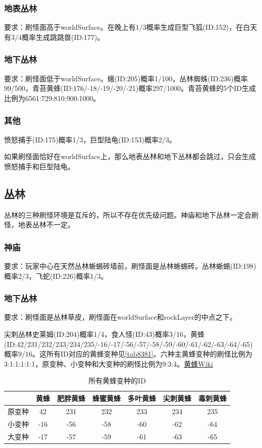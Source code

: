 \subsubsection{地表丛林}
要求：刷怪面高于worldSurface。在晚上有1/3概率生成巨型飞狐(ID:152)，在白天有3/4概率生成跳跳兽(ID:177)。

\subsubsection{地下丛林}
要求：刷怪面低于worldSurface。蛾(ID:205)概率1/100，丛林蜘蛛(ID:236)概率99/500，青苔黄蜂(ID:176/-18/-19/-20/-21)概率297/1000。青苔黄蜂的5个ID生成比例为6561:729:810:900:1000。

\subsubsection{其他}
愤怒捕手(ID:175)概率1/3，巨型陆龟(ID:153)概率2/3。

\begin{remark}
如果刷怪面恰好在worldSurface上，那么地表丛林和地下丛林都会跳过，只会生成愤怒捕手和巨型陆龟。
\end{remark}

\subsection{丛林}
丛林的三种刷怪环境是互斥的，所以不存在优先级问题。神庙和地下丛林一定会刷怪，地表丛林不一定。

\subsubsection{神庙}
要求：玩家中心在天然丛林蜥蜴砖墙前，刷怪面是丛林蜥蜴砖。丛林蜥蜴(ID:198)概率2/3，飞蛇(ID:226)概率1/3。

\subsubsection{地下丛林}
要求：刷怪面是丛林草皮，刷怪面在worldSurface和rockLayer的中点之下。

尖刺丛林史莱姆(ID:204)概率1/4，食人怪(ID:43)概率3/16，黄蜂(ID:42/231/232/233/234/235/-16/-17/-56/-57/-58/-59/-60/-61/-62/-63/-64/-65)概率9/16。这所有ID对应的黄蜂变种见\autoref{tab8381}。六种主黄蜂变种的刷怪比例为3:1:1:1:1:1，原变种、小变种和大变种的刷怪比例为9:3:4。\href{https://terraria-zh.gamepedia.com/黄蜂}{黄蜂Wiki}

\begin{table}[!h]
    \centering
    \begin{tabular}{c|cccccc}
         &黄蜂&肥胖黄蜂&蜂蜜黄蜂&多叶黄蜂&尖刺黄蜂&毒刺黄蜂\\\hline
         原变种&42&231&232&233&234&235\\
         小变种&-16&-56&-58&-60&-62&-64\\
         大变种&-17&-57&-59&-61&-63&-65
    \end{tabular}
    \caption{所有黄蜂变种的ID}
    \label{tab8381}
\end{table}

